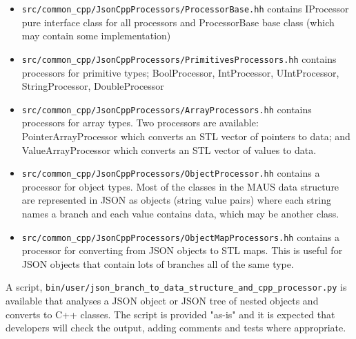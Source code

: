 \begin{itemize}
\item \verb|src/common_cpp/JsonCppProcessors/ProcessorBase.hh| contains IProcessor pure interface class for all processors and ProcessorBase base class (which may contain some implementation)
\item \verb|src/common_cpp/JsonCppProcessors/PrimitivesProcessors.hh| contains processors for primitive types; BoolProcessor, IntProcessor, UIntProcessor, StringProcessor, DoubleProcessor
\item \verb|src/common_cpp/JsonCppProcessors/ArrayProcessors.hh| contains processors for array types. Two processors are available: PointerArrayProcessor which converts an STL vector of pointers to data; and ValueArrayProcessor which converts an STL vector of values to data.
\item \verb|src/common_cpp/JsonCppProcessors/ObjectProcessor.hh| contains a processor for object types. Most of the classes in the MAUS data structure are represented in JSON as objects (string value pairs) where each string names a branch and each value contains data, which may be another class.
\item \verb|src/common_cpp/JsonCppProcessors/ObjectMapProcessors.hh| contains a processor for converting from JSON objects to STL maps. This is useful for JSON objects that contain lots of branches all of the same type.
\end{itemize}

A script, \verb|bin/user/json_branch_to_data_structure_and_cpp_processor.py| is available that analyses a JSON object or JSON tree of nested objects and converts to C++ classes. The script is provided "as-is" and it is expected that developers will check the output, adding comments and tests where appropriate.

